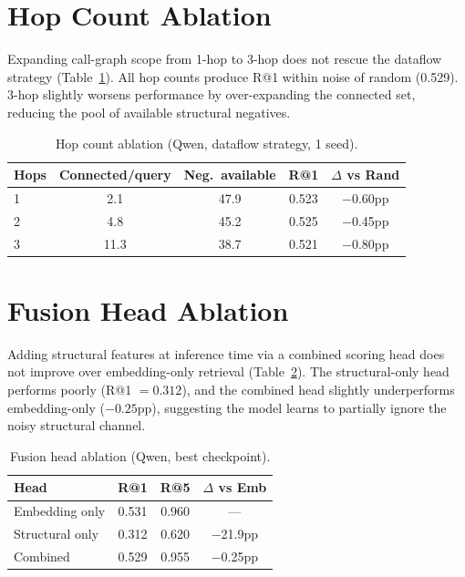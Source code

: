 \documentclass[11pt,a4paper]{article}
\begin{document}
\section{Hop Count Ablation}
\label{app:hop}

Expanding call-graph scope from 1-hop to 3-hop does not rescue the dataflow strategy (Table~\ref{tab:hop}).
All hop counts produce R@1 within noise of random (0.529).
3-hop slightly worsens performance by over-expanding the connected set, reducing the pool of available structural negatives.

\begin{table}[h]
\centering
\caption{Hop count ablation (Qwen, dataflow strategy, 1 seed).}
\label{tab:hop}
\small
\begin{tabular}{lcccc}
\toprule
\textbf{Hops} & \textbf{Connected/query} & \textbf{Neg.\ available} & \textbf{R@1} & $\Delta$ \textbf{vs Rand} \\
\midrule
1 & 2.1 & 47.9 & 0.523 & $-$0.60pp \\
2 & 4.8 & 45.2 & 0.525 & $-$0.45pp \\
3 & 11.3 & 38.7 & 0.521 & $-$0.80pp \\
\bottomrule
\end{tabular}
\end{table}

\section{Fusion Head Ablation}
\label{app:fusion}

Adding structural features at inference time via a combined scoring head does not improve over embedding-only retrieval (Table~\ref{tab:fusion}).
The structural-only head performs poorly (R@1 $= 0.312$), and the combined head slightly underperforms embedding-only ($-0.25$pp), suggesting the model learns to partially ignore the noisy structural channel.

\begin{table}[h]
\centering
\caption{Fusion head ablation (Qwen, best checkpoint).}
\label{tab:fusion}
\small
\begin{tabular}{lccc}
\toprule
\textbf{Head} & \textbf{R@1} & \textbf{R@5} & $\Delta$ \textbf{vs Emb} \\
\midrule
Embedding only & 0.531 & 0.960 & --- \\
Structural only & 0.312 & 0.620 & $-$21.9pp \\
Combined & 0.529 & 0.955 & $-$0.25pp \\
\bottomrule
\end{tabular}
\end{table}
\end{document}
